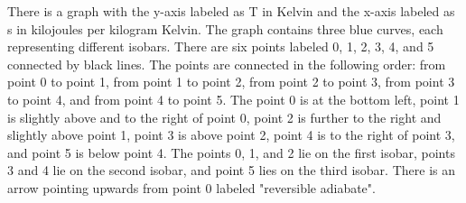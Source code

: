 There is a graph with the y-axis labeled as T in Kelvin and the x-axis labeled as s in kilojoules per kilogram Kelvin. The graph contains three blue curves, each representing different isobars. There are six points labeled 0, 1, 2, 3, 4, and 5 connected by black lines. The points are connected in the following order: from point 0 to point 1, from point 1 to point 2, from point 2 to point 3, from point 3 to point 4, and from point 4 to point 5. The point 0 is at the bottom left, point 1 is slightly above and to the right of point 0, point 2 is further to the right and slightly above point 1, point 3 is above point 2, point 4 is to the right of point 3, and point 5 is below point 4. The points 0, 1, and 2 lie on the first isobar, points 3 and 4 lie on the second isobar, and point 5 lies on the third isobar. There is an arrow pointing upwards from point 0 labeled "reversible adiabate".